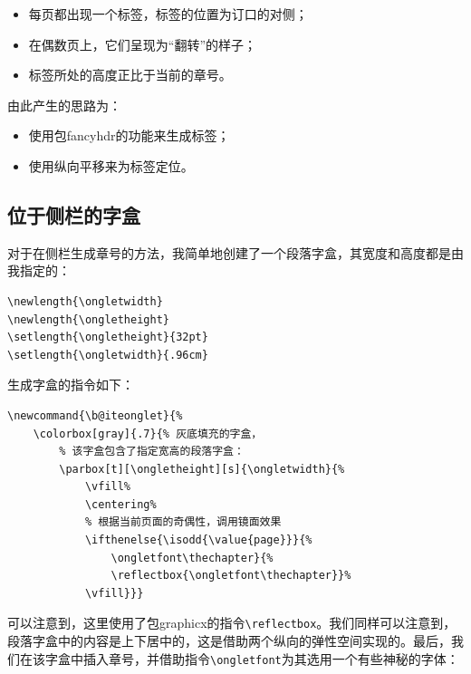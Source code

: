 \begin{itemize}
    \item 每页都出现一个标签，标签的位置为订口的对侧；
    \item 在偶数页上，它们呈现为“翻转”的样子；
    \item 标签所处的高度正比于当前的章号。
\end{itemize}

由此产生的思路为：

\begin{itemize}
    \item 使用包\textsf{fancyhdr}的功能来生成标签；
    \item 使用纵向平移来为标签定位。
\end{itemize}

\subsection{位于侧栏的字盒}

对于在侧栏生成章号的方法，我简单地创建了一个段落字盒，其宽度和高度都是由我指定的：

\begin{dmd}
\begin{verbatim}
\newlength{\ongletwidth}
\newlength{\ongletheight}
\setlength{\ongletheight}{32pt}
\setlength{\ongletwidth}{.96cm}
\end{verbatim}
\end{dmd}

生成字盒的指令如下：

\begin{dmd}
\begin{verbatim}
\newcommand{\b@iteonglet}{%
    \colorbox[gray]{.7}{% 灰底填充的字盒，
        % 该字盒包含了指定宽高的段落字盒：
        \parbox[t][\ongletheight][s]{\ongletwidth}{%
            \vfill% 
            \centering%
            % 根据当前页面的奇偶性，调用镜面效果
            \ifthenelse{\isodd{\value{page}}}{%
                \ongletfont\thechapter}{%
                \reflectbox{\ongletfont\thechapter}}% 
            \vfill}}}
\end{verbatim}
\end{dmd}

可以注意到，这里使用了包\textsf{graphicx}的指令\verb|\reflectbox|。我们同样可以注意到，段落字盒中的内容是上下居中的，这是借助两个纵向的弹性空间实现的。最后，我们在该字盒中插入章号，并借助指令\verb|\ongletfont|为其选用一个有些神秘的字体：


